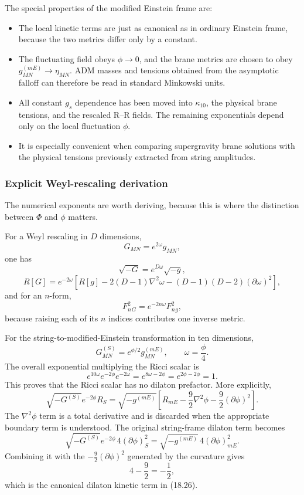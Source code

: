 \documentclass[
  10pt,
  a4paper,
  openany]{book}
\providecommand{\tightlist}{%
  \setlength{\itemsep}{0pt}\setlength{\parskip}{0pt}}
\begin{document}
The special properties of the modified Einstein frame are:

\begin{itemize}
\tightlist
\item
  The local kinetic terms are just as canonical as in ordinary Einstein
  frame, because the two metrics differ only by a constant.
\item
  The fluctuating field obeys \(\phi\to0\), and the brane metrics are
  chosen to obey \(g^{(mE)}_{MN}\to\eta_{MN}\). ADM masses and tensions
  obtained from the asymptotic falloff can therefore be read in standard
  Minkowski units.
\item
  All constant \(g_s\) dependence has been moved into \(\kappa_{10}\),
  the physical brane tensions, and the rescaled R--R fields. The
  remaining exponentials depend only on the local fluctuation \(\phi\).
\item
  It is especially convenient when comparing supergravity brane
  solutions with the physical tensions previously extracted from string
  amplitudes.
\end{itemize}

\subsubsection{Explicit Weyl-rescaling
derivation}\label{explicit-weyl-rescaling-derivation}

The numerical exponents are worth deriving, because this is where the
distinction between \(\Phi\) and \(\phi\) matters.

For a Weyl rescaling in \(D\) dimensions, \[
G_{MN}=e^{2\omega}g_{MN},
\] one has \[
\sqrt{-G}=e^{D\omega}\sqrt{-g},
\] \[
R[G]=e^{-2\omega}
\left[
R[g]-2(D-1)\nabla^2\omega
-(D-1)(D-2)(\partial\omega)^2
\right],
\] and for an \(n\)-form, \[
F_n^2{}_G=e^{-2n\omega}F_n^2{}_g,
\] because raising each of its \(n\) indices contributes one inverse
metric.

For the string-to-modified-Einstein transformation in ten dimensions, \[
G^{(S)}_{MN}=e^{\phi/2}g^{(mE)}_{MN},
\qquad
\omega=\frac\phi4.
\] The overall exponential multiplying the Ricci scalar is \[
e^{10\omega}e^{-2\phi}e^{-2\omega}
=e^{8\omega-2\phi}
=e^{2\phi-2\phi}=1.
\] This proves that the Ricci scalar has no dilaton prefactor. More
explicitly, \[
\sqrt{-G^{(S)}}e^{-2\phi}R_S
=\sqrt{-g^{(mE)}}
\left[
R_{mE}-\frac92\nabla^2\phi
-\frac92(\partial\phi)^2
\right].
\] The \(\nabla^2\phi\) term is a total derivative and is discarded when
the appropriate boundary term is understood. The original string-frame
dilaton term becomes \[
\sqrt{-G^{(S)}}e^{-2\phi}\,4(\partial\phi)^2_S
=\sqrt{-g^{(mE)}}\,4(\partial\phi)^2_{mE}.
\] Combining it with the \(-\frac92(\partial\phi)^2\) generated by the
curvature gives \[
4-\frac92=-\frac12,
\] which is the canonical dilaton kinetic term in (18.26).
\end{document}
